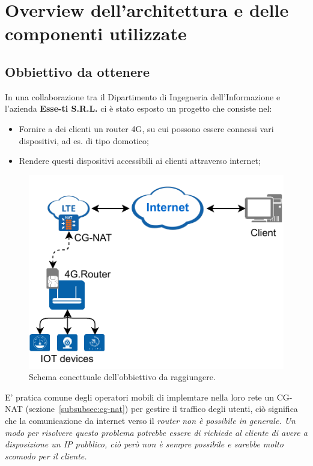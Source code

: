 

\chapter{Overview dell'architettura e delle componenti utilizzate \workinprogress}

\label{ch:overview}

\section{Obbiettivo da ottenere \workinprogress}
\label{sec:overview-goal}

In una collaborazione tra il Dipartimento di Ingegneria dell'Informazione e l'azienda \textbf{Esse-ti S.R.L.} ci è stato esposto un progetto che consiste nel:

\begin{itemize}
	\itemsep0.2em
	\item Fornire a dei clienti un router 4G, su cui possono essere connessi vari dispositivi, ad es. di tipo domotico;
	\item Rendere questi dispositivi accessibili ai clienti attraverso internet;
\end{itemize}

\begin{figure}[H]
	\centering
	\includegraphics[width=0.5\linewidth]{immagini/diag-goal}
	\caption{Schema concettuale dell'obbiettivo da raggiungere.}
	\label{fig:schema_concettuale}
\end{figure}

E' pratica comune degli operatori mobili di implemtare nella loro rete un CG-NAT (sezione~\ref{subsubsec:cg-nat}) per gestire il traffico degli utenti, ciò significa che la comunicazione da internet verso il \it{router} non è possibile in generale. Un modo per risolvere questo problema potrebbe essere di richiede al cliente di avere a disposizione un IP pubblico, ciò però non è sempre possibile e sarebbe molto scomodo per il cliente. 

